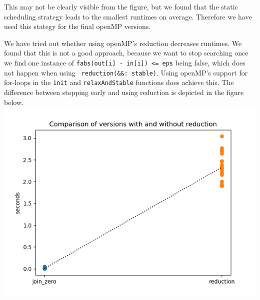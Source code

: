 \documentclass[a4paper]{article}
\begin{document}
\noindent This may not be clearly visible from the figure, but we found that the static scheduling strategy leads to the smallest runtimes on average. Therefore we have used this stategy for the final openMP versions.

We have tried out whether using openMP's reduction decreases runtimes. We found that this is not a good approach, because we want to stop searching once we find one instance of \texttt{fabs(out[i] - in[i]) <= eps} being false, which does not happen when using \texttt{ reduction(\&\&: stable)}. Using openMP's support for for-loops in the \texttt{init} and \texttt{relaxAndStable} functions does achieve this. The difference between stopping early and using reduction is depicted in the figure below.\\
\includegraphics[scale = 0.5]{graphs/Comparison of versions with and without reduction.png}\\
\end{document}
